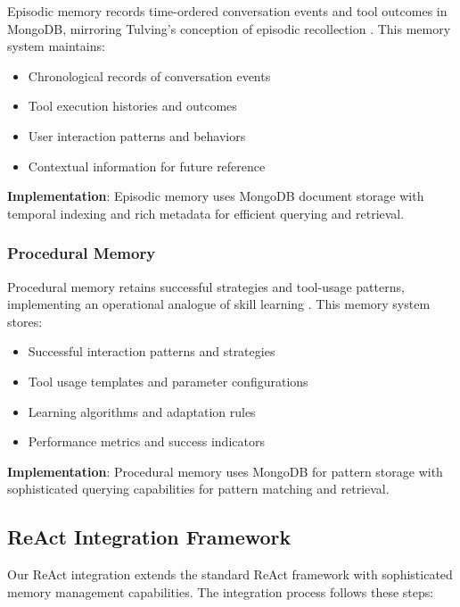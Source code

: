 \documentclass[11pt]{article}
\begin{document}
Episodic memory records time-ordered conversation events and tool outcomes in MongoDB, mirroring Tulving's conception of episodic recollection \cite{tulving1972episodic}. This memory system maintains:

\begin{itemize}
\item Chronological records of conversation events
\item Tool execution histories and outcomes
\item User interaction patterns and behaviors
\item Contextual information for future reference
\end{itemize}

\textbf{Implementation}: Episodic memory uses MongoDB document storage with temporal indexing and rich metadata for efficient querying and retrieval.

\subsubsection{Procedural Memory}

Procedural memory retains successful strategies and tool-usage patterns, implementing an operational analogue of skill learning \cite{anderson1982skill}. This memory system stores:

\begin{itemize}
\item Successful interaction patterns and strategies
\item Tool usage templates and parameter configurations
\item Learning algorithms and adaptation rules
\item Performance metrics and success indicators
\end{itemize}

\textbf{Implementation}: Procedural memory uses MongoDB for pattern storage with sophisticated querying capabilities for pattern matching and retrieval.

\subsection{ReAct Integration Framework}

Our ReAct integration extends the standard ReAct framework with sophisticated memory management capabilities. The integration process follows these steps:
\end{document}
